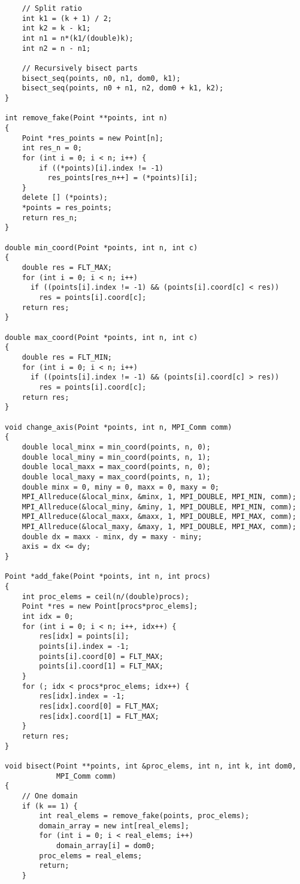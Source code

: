 \documentclass[oneside,final,14pt]{extreport}
\begin{document}
\begin{verbatim}
    // Split ratio
    int k1 = (k + 1) / 2;
    int k2 = k - k1;
    int n1 = n*(k1/(double)k);
    int n2 = n - n1;

    // Recursively bisect parts
    bisect_seq(points, n0, n1, dom0, k1);
    bisect_seq(points, n0 + n1, n2, dom0 + k1, k2);
}

int remove_fake(Point **points, int n)
{
    Point *res_points = new Point[n];
    int res_n = 0;
    for (int i = 0; i < n; i++) {
        if ((*points)[i].index != -1)
          res_points[res_n++] = (*points)[i];
    }
    delete [] (*points);
    *points = res_points;
    return res_n;
}

double min_coord(Point *points, int n, int c)
{
    double res = FLT_MAX;
    for (int i = 0; i < n; i++)
      if ((points[i].index != -1) && (points[i].coord[c] < res))
        res = points[i].coord[c];
    return res;
}

double max_coord(Point *points, int n, int c)
{
    double res = FLT_MIN;
    for (int i = 0; i < n; i++)
      if ((points[i].index != -1) && (points[i].coord[c] > res))
        res = points[i].coord[c];
    return res;
}

void change_axis(Point *points, int n, MPI_Comm comm)
{
    double local_minx = min_coord(points, n, 0);
    double local_miny = min_coord(points, n, 1);
    double local_maxx = max_coord(points, n, 0);
    double local_maxy = max_coord(points, n, 1);
    double minx = 0, miny = 0, maxx = 0, maxy = 0;
    MPI_Allreduce(&local_minx, &minx, 1, MPI_DOUBLE, MPI_MIN, comm);
    MPI_Allreduce(&local_miny, &miny, 1, MPI_DOUBLE, MPI_MIN, comm);
    MPI_Allreduce(&local_maxx, &maxx, 1, MPI_DOUBLE, MPI_MAX, comm);
    MPI_Allreduce(&local_maxy, &maxy, 1, MPI_DOUBLE, MPI_MAX, comm);
    double dx = maxx - minx, dy = maxy - miny;
    axis = dx <= dy;
}

Point *add_fake(Point *points, int n, int procs)
{
    int proc_elems = ceil(n/(double)procs);
    Point *res = new Point[procs*proc_elems];
    int idx = 0;
    for (int i = 0; i < n; i++, idx++) {
        res[idx] = points[i];
        points[i].index = -1;
        points[i].coord[0] = FLT_MAX;
        points[i].coord[1] = FLT_MAX;
    }
    for (; idx < procs*proc_elems; idx++) {
        res[idx].index = -1;
        res[idx].coord[0] = FLT_MAX;
        res[idx].coord[1] = FLT_MAX;
    }
    return res;
}

void bisect(Point **points, int &proc_elems, int n, int k, int dom0,
            MPI_Comm comm)
{
    // One domain
    if (k == 1) {
        int real_elems = remove_fake(points, proc_elems);
        domain_array = new int[real_elems];
        for (int i = 0; i < real_elems; i++)
            domain_array[i] = dom0;
        proc_elems = real_elems;
        return;
    }


\end{verbatim}
\end{document}
